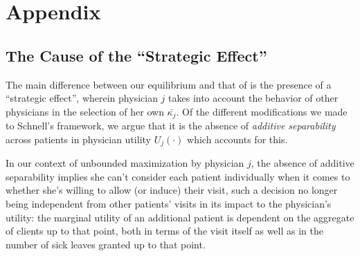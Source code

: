 \documentclass[../main.tex]{subfiles}
\begin{document}
\section*{Appendix}  %
\renewcommand{\thesubsection}{A.\arabic{subsection}}  
\renewcommand{\thesection}{A}  %
\renewcommand{\thetheorem}{A.\thesection.\arabic{theorem}}
\setcounter{theorem}{0} %
\newtheorem{appendixtheorem}{Theorem}[section] %


\subsection{The Cause of the ``Strategic Effect''}
\label{sec:separate}

The main difference between our equilibrium and that of \cite{schnell2017physician} is the presence of a ``strategic effect'', wherein physician $j$ takes into account the behavior of other physicians in the selection of her own $\bar{\kappa_j}$. Of the different modifications we made to Schnell's framework, we argue that it is the absence of \textit{additive separability} across patients in physician utility $U_j(\cdot)$ which accounts for this.

In our context of unbounded maximization by physician $j$, the absence of additive separability implies she can't consider each patient individually when it comes to whether she's willing to allow (or induce) their visit, such a decision no longer being independent from other patients' visits in its impact to the physician's utility: the marginal utility of an additional patient is dependent on the aggregate of clients up to that point, both in terms of the visit itself as well as in the number of sick leaves granted up to that point.
\end{document}
